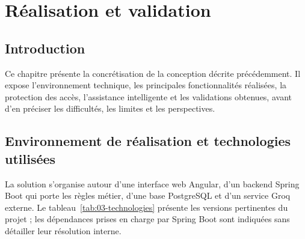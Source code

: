 \chapter{Réalisation et validation}
\label{chap:03-realisation-validation}
\clearpage


\section*{Introduction}
{}

Ce chapitre présente la concrétisation de la conception décrite précédemment. Il expose l'environnement technique, les principales fonctionnalités réalisées, la protection des accès, l'assistance intelligente et les validations obtenues, avant d'en préciser les difficultés, les limites et les perspectives.

\captionsetup[figure]{belowskip=18pt}

\section{Environnement de réalisation et technologies utilisées}
\label{sec:03-environnement}

La solution s'organise autour d'une interface web Angular, d'un backend Spring Boot qui porte les règles métier, d'une base PostgreSQL et d'un service Groq externe. Le tableau~\ref{tab:03-technologies} présente les versions pertinentes du projet ; les dépendances prises en charge par Spring Boot sont indiquées sans détailler leur résolution interne.

